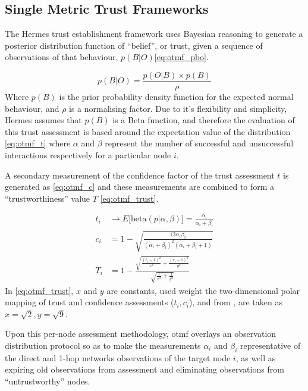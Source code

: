 \subsection{Single Metric Trust Frameworks}
The Hermes trust establishment framework \cite{Zouridaki2005} uses Bayesian reasoning to generate a posterior distribution function of ``belief'', or trust, given a sequence of observations of that behaviour, $p(B|O)$\eqref{eq:otmf_pbo}.

\begin{equation}
  p(B|O)  = \frac{p(O|B) \times p(B)}{\rho}
  \label{eq:otmf_pbo}
\end{equation}
Where $p(B)$ is the prior probability density function for the expected normal behaviour, and $\rho$ is a normalising factor.
Due to it's flexibility and simplicity, Hermes assumes that $p(B)$ is a Beta function, and therefore the evaluation of this trust assessment is based around the expectation value of the distribution \eqref{eq:otmf_t}  where $\alpha$ and $\beta$ represent the number of successful and unsuccessful interactions respectively for a particular node $i$.

A secondary measurement of the confidence factor of the trust assessment $t$ is generated as \eqref{eq:otmf_c} and these measurements are combined to form a ``trustworthiness'' value $T$ \eqref{eq:otmf_trust}.

\begin{align}
  t_i &\to E\lbrack\text{beta}(p|\alpha,\beta)\rbrack = \frac{\alpha_i}{\alpha_i+\beta_i} \label{eq:otmf_t}\\[5pt]
  c_i &= 1 - \sqrt{\frac{12\alpha_i\beta_i}{(\alpha_i+\beta_i)^2(\alpha_i+\beta_i+1)}} \label{eq:otmf_c}\\[5pt]
  T_i &= 1 - \frac{\sqrt{\frac{(t_i-1)^2}{x^2} + \frac{(c_i-1)^2}{y^2}}}{\sqrt{\frac{1}{x^2}+\frac{1}{y^2}}} \label{eq:otmf_trust}
\end{align}
In \eqref{eq:otmf_trust}, $x$ and $y$ are constants, used weight the two-dimensional polar mapping of trust and confidence assessments ($t_i,c_i$), and from \cite{Zouridaki2005}, are taken as $x=\sqrt{2},y=\sqrt{9}$.

Upon this per-node assessment methodology, \acrshort{otmf} overlays an observation distribution protocol so as to make the measurements $\alpha_i$ and $\beta_i$ representative of the direct and 1-hop networks observations of the target node $i$, as well as expiring old observations from assessment and eliminating observations from ``untrustworthy'' nodes.

